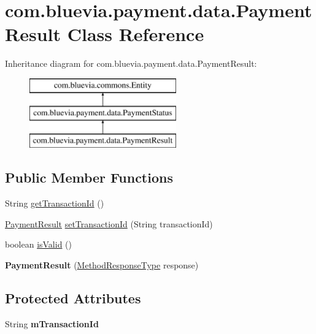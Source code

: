 \hypertarget{classcom_1_1bluevia_1_1payment_1_1data_1_1PaymentResult}{
\section{com.bluevia.payment.data.PaymentResult Class Reference}
\label{classcom_1_1bluevia_1_1payment_1_1data_1_1PaymentResult}
}
Inheritance diagram for com.bluevia.payment.data.PaymentResult:\begin{figure}[H]
\begin{center}
\leavevmode
\includegraphics[height=3.000000cm]{classcom_1_1bluevia_1_1payment_1_1data_1_1PaymentResult}
\end{center}
\end{figure}
\subsection*{Public Member Functions}
\begin{DoxyCompactItemize}
\item 
String \hyperlink{classcom_1_1bluevia_1_1payment_1_1data_1_1PaymentResult_a264be51dd6af73d54a5ddcd4e66fee32}{getTransactionId} ()
\item 
\hyperlink{classcom_1_1bluevia_1_1payment_1_1data_1_1PaymentResult}{PaymentResult} \hyperlink{classcom_1_1bluevia_1_1payment_1_1data_1_1PaymentResult_a94b7de727a64360c113d6a4970829a85}{setTransactionId} (String transactionId)
\item 
boolean \hyperlink{classcom_1_1bluevia_1_1payment_1_1data_1_1PaymentResult_a67f3366d48600309719377e0e3b98cb6}{isValid} ()
\item 
\hypertarget{classcom_1_1bluevia_1_1payment_1_1data_1_1PaymentResult_a4cab529a9f8a29c2c3ad05c685395dba}{
{\bfseries PaymentResult} (\hyperlink{classcom_1_1telefonica_1_1schemas_1_1unica_1_1rpc_1_1payment_1_1v1_1_1MethodResponseType}{MethodResponseType} response)}
\label{classcom_1_1bluevia_1_1payment_1_1data_1_1PaymentResult_a4cab529a9f8a29c2c3ad05c685395dba}

\end{DoxyCompactItemize}
\subsection*{Protected Attributes}
\begin{DoxyCompactItemize}
\item 
\hypertarget{classcom_1_1bluevia_1_1payment_1_1data_1_1PaymentResult_ad0a22d4ba51ee610ba719b805c4e2f82}{
String {\bfseries mTransactionId}}
\label{classcom_1_1bluevia_1_1payment_1_1data_1_1PaymentResult_ad0a22d4ba51ee610ba719b805c4e2f82}

\end{DoxyCompactItemize}



